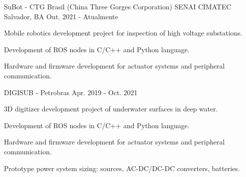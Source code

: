

\begin{cventries}

  \cventry
    {SuBot - CTG Brasil (China Three Gorges Corporation)} %
    {SENAI CIMATEC} %
    {Salvador, BA} %
    {Out. 2021 - Atualmente} %
    {
      \begin{cvitems} %
        \item {Mobile robotics development project for inspection of high voltage substations.}
        \item {Development of ROS nodes in C/C++ and Python language.}
        \item {Hardware and firmware development for actuator systems and peripheral communication.}
      \end{cvitems}
    }


  \cventry
    {DIGISUB - Petrobras} %
    {} %
    {} %
    {Apr. 2019 - Oct. 2021} %
    {
      \begin{cvitems} %
        \item {3D digitizer development project of underwater surfaces in deep water.}
        \item {Development of ROS nodes in C/C++ and Python language.}
        \item {Hardware and firmware development for actuator systems and peripheral communication.}
        \item {Prototype power system sizing: sources, AC-DC/DC-DC converters, batteries.}
      \end{cvitems}
    }



\end{cventries}
